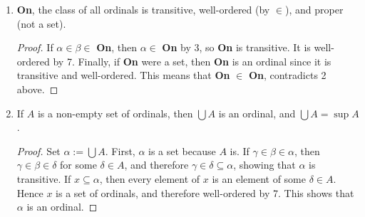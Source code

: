 \documentclass[12pt]{article}
\begin{document}
\begin{enumerate}
\begin{proof}
\end{proof}
\item \textbf{On}, the class of all ordinals is transitive, well-ordered (by $\in$), and proper (not a set).
\begin{proof}  If $\alpha \in \beta\in $ \textbf{On}, then $\alpha \in $ \textbf{On} by 3, so \textbf{On} is transitive.  It is well-ordered by 7.  Finally, if \textbf{On} were a set, then \textbf{On} is an ordinal since it is transitive and well-ordered.  This means that \textbf{On} $\in$ \textbf{On}, contradicts 2 above.
\end{proof}
\item If $A$ is a non-empty set of ordinals, then $\bigcup A$ is an ordinal, and $\bigcup A = \sup A$.
\begin{proof}  Set $\alpha:=\bigcup A$.  First, $\alpha$ is a set because $A$ is.  If $\gamma \in \beta\in \alpha$, then $\gamma \in \beta \in \delta$ for some $\delta \in A$, and therefore $\gamma\in \delta \subseteq \alpha$, showing that $\alpha$ is transitive.  If $x\subseteq \alpha$, then every element of $x$ is an element of some $\delta\in A$.  Hence $x$ is a set of ordinals, and therefore well-ordered by 7.  This shows that $\alpha$ is an ordinal.


\end{proof}
\end{enumerate}
\end{document}
